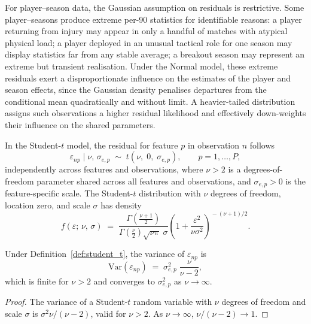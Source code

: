 For player--season data, the Gaussian assumption on residuals is restrictive. Some player--seasons produce extreme per-90 statistics for identifiable reasons: a player returning from injury may appear in only a handful of matches with atypical physical load; a player deployed in an unusual tactical role for one season may display statistics far from any stable average; a breakout season may represent an extreme but transient realisation. Under the Normal model, these extreme residuals exert a disproportionate influence on the estimates of the player and season effects, since the Gaussian density penalises departures from the conditional mean quadratically and without limit. A heavier-tailed distribution assigns such observations a higher residual likelihood and effectively down-weights their influence on the shared parameters.

\begin{definition}
\label{def:student_t}
In the Student-$t$ model, the residual for feature $p$ in observation $n$ follows
\begin{equation}
\varepsilon_{np} \mid \nu,\, \sigma_{e,p} \;\sim\; t\!\left(\nu,\; 0,\; \sigma_{e,p}\right), \qquad p = 1, \ldots, P,
\label{eq:t_resid}
\end{equation}
independently across features and observations, where $\nu > 2$ is a degrees-of-freedom parameter shared across all features and observations, and $\sigma_{e,p} > 0$ is the feature-specific scale. The Student-$t$ distribution with $\nu$ degrees of freedom, location zero, and scale $\sigma$ has density
\begin{equation}
f(\varepsilon;\, \nu,\, \sigma) \;=\; \frac{\Gamma\!\left(\tfrac{\nu+1}{2}\right)}{\Gamma\!\left(\tfrac{\nu}{2}\right)\sqrt{\nu\pi}\;\sigma} \left(1 + \frac{\varepsilon^2}{\nu\sigma^2}\right)^{\!-(\nu+1)/2}.
\label{eq:t_density}
\end{equation}
\end{definition}

\begin{proposition}
\label{prop:t_variance}
Under Definition~\ref{def:student_t}, the variance of $\varepsilon_{np}$ is
\begin{equation}
\mathrm{Var}(\varepsilon_{np}) \;=\; \sigma_{e,p}^2\;\frac{\nu}{\nu - 2},
\label{eq:t_variance}
\end{equation}
which is finite for $\nu > 2$ and converges to $\sigma_{e,p}^2$ as $\nu \to \infty$.
\end{proposition}
\begin{proof}
The variance of a Student-$t$ random variable with $\nu$ degrees of freedom and scale $\sigma$ is $\sigma^2 \nu/(\nu - 2)$, valid for $\nu > 2$. As $\nu \to \infty$, $\nu/(\nu-2) \to 1$.
\end{proof}

